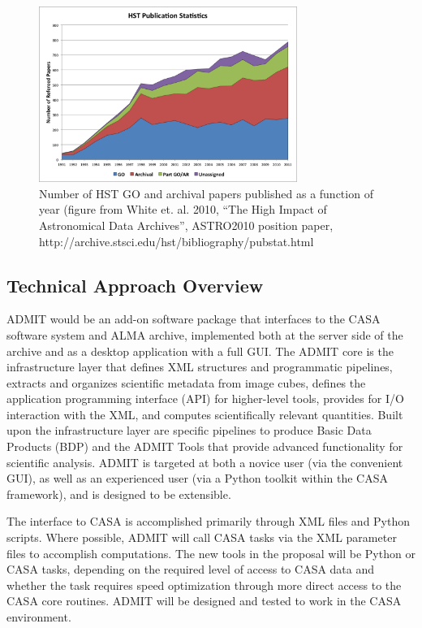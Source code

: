 \begin{figure}[t]
\centering
\includegraphics[width=0.75\textwidth]{hstpubs.png}
\hspace{0.03in}
\caption{\small \setlength{\baselineskip}{0.85\baselineskip}
Number of HST GO and archival papers published as a function of year (figure from
White et. al. 2010, ``The High Impact of Astronomical Data Archives'', ASTRO2010 position paper, 
http://archive.stsci.edu/hst/bibliography/pubstat.html
  }
\label{fig:hst}
\end{figure}

\subsection{Technical Approach Overview}

ADMIT would be an add-on software package that interfaces to the CASA software system 
and ALMA archive, implemented both at the server side of the archive and as a 
desktop application with a full GUI. 
The ADMIT core is the infrastructure layer that defines XML structures and 
programmatic pipelines, extracts and organizes scientific metadata from 
image cubes, defines the application programming interface (API) for higher-level tools, 
provides for I/O interaction with the XML, and computes scientifically relevant 
quantities. Built upon the infrastructure layer are specific pipelines to produce 
Basic Data Products (BDP) and the ADMIT Tools that provide advanced functionality 
for scientific analysis. ADMIT is targeted at both a novice user 
(via the convenient GUI), as well as an experienced user (via a Python toolkit 
within the CASA framework), and is designed to be extensible.

The interface to CASA is accomplished primarily through XML files and Python 
scripts. Where possible, ADMIT will call CASA tasks via the XML parameter files 
to accomplish computations. The new tools in the proposal will be Python or 
CASA tasks, depending on the required level of access to CASA data and 
whether the task requires speed optimization through more direct access to the 
CASA core routines. ADMIT will be designed and tested to work in the CASA environment.

